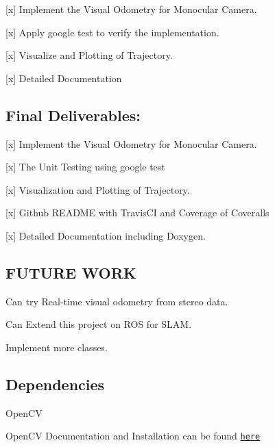 \begin{DoxyItemize}
\item \mbox{[}x\mbox{]} Implement the Visual Odometry for Monocular Camera.
\item \mbox{[}x\mbox{]} Apply google test to verify the implementation.
\item \mbox{[}x\mbox{]} Visualize and Plotting of Trajectory.
\item \mbox{[}x\mbox{]} Detailed Documentation \subsection*{Final Deliverables\+:}
\end{DoxyItemize}


\begin{DoxyItemize}
\item \mbox{[}x\mbox{]} Implement the Visual Odometry for Monocular Camera.
\item \mbox{[}x\mbox{]} The Unit Testing using google test
\item \mbox{[}x\mbox{]} Visualization and Plotting of Trajectory.
\item \mbox{[}x\mbox{]} Github R\+E\+A\+D\+ME with Travis\+CI and Coverage of Coveralls
\item \mbox{[}x\mbox{]} Detailed Documentation including Doxygen.
\end{DoxyItemize}

\subsection*{F\+U\+T\+U\+RE W\+O\+RK}


\begin{DoxyItemize}
\item Can try Real-\/time visual odometry from stereo data.
\item Can Extend this project on R\+OS for S\+L\+AM.
\item Implement more classes.
\end{DoxyItemize}

\subsection*{Dependencies}


\begin{DoxyItemize}
\item Open\+CV
\item Open\+CV Documentation and Installation can be found \href{https://docs.opencv.org/trunk/d7/d9f/tutorial_linux_install.html}{\tt here}
\end{DoxyItemize}

